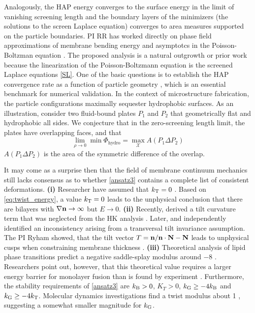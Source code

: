 Analogously, the HAP energy converges to the surface energy in the limit of vanishing screening length 
and the boundary layers of the minimizers (the solutions to the screen Laplace equation) converges to 
area measures supported on the particle boundaries. 
PI RR has worked directly on phase field approximations of membrane bending energy 
\cite{0951-7715-18-3-016} and asymptotcs in the Poisson-Boltzman equation \cite{1531-3492_2006_2_357,Lee2018}.
The proposed analysis is a natural outgrowth or prior work because the linearization of the Poisson-Boltzmann equation is the screened Laplace equations \eqref{SL}.
One of the basic questions is to establish the HAP convergence rate as a function of particle geometry 
\cite{LuMo89}, which is an essential benchmark for numerical validation. 
In the context of microstructure fabrication, the particle configurations maximally sequester hydrophobic surfaces.  
As an illustration, consider two fluid-bound plates $P_1$ and $P_2$ that geometrically flat and hydrophobic all sides.
We conjecture that in the zero-screening length limit, the plates have overlapping faces, and that 
\begin{equation}
\lim_{\rho \to 0} \min \Phi_{\text{hydro}} = \max_{\mathcal{X}} A(P_1 \Delta P_2)
\end{equation}
$A(P_1 \Delta P_2)$ is the area of the symmetric difference of the overlap.  
\cite{https://doi.org/10.1038/s41467-019-09787-6}


 It may come as a surprise then that the field of membrane continuum mechanics still lacks consensus as to
 whether \eqref{ansatz3} contains a complete list of consistent deformations.
\textbf{(i)} Researcher have assumed that $k_{\mathrm{T}} = 0$ \cite{Hamm2000, TerziDeserno17, C9SM02079A, PhysRevE.102.042406}.
  Based on \eqref{eq:twist_energy}, a value $k_{\mathrm{T}} = 0$ leads to the
  unphysical conclusion that there are bilayers with $\nabla {\bf n} \to \infty$ but $E \to 0.$ 
  \textbf{(ii)}
  Recently, \cite{TerziDeserno17} derived a tilt curvature term that was neglected from the HK analysis \cite{Hamm2000}.
  Later, \cite{C9SM02079A} 
  and \cite{PhysRevE.102.042406} independently identified an inconsistency \cite{TerziDeserno17} arising
  from a transversal tilt invariance assumption.
  The PI Ryham showed,  that the tilt vector $T = {\bf n}/{\bf n}\cdot {\bf N} - {\bf N}$ leads to unphysical cusps when constraining membrane thickness  \cite{RyKlYaCo16}.  
  \textbf{(iii)}
  Theoretical analysis of lipid phase transitions predict a negative saddle-splay modulus around $-8$ \kBT\;
\cite{SIEGEL2004366,SIEGEL20085200}. Researchers point out, however, that this theoretical value requires a larger energy 
barrier for monolayer fusion than is found by experiment \cite{FrRoPi17,Tran7106,TerziDeserno17}.
Furthermore, the stability requirements of \eqref{ansatz3} are $k_{\mathrm{B}} > 0$, $K_T > 0$, $k_{\mathrm{G}} \geq -4k_{\mathrm{B}}$
and $k_{\mathrm{G}} \geq -4k_{\mathrm{T}}$. Molecular dynamics investigations find a twist modulus about 1 \kBT \cite{LeVeWa14},
suggesting a somewhat smaller magnitude for $k_{\mathrm{G}}$.

